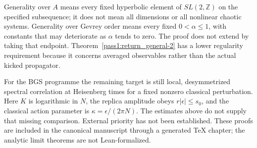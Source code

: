 Generality over \(A\) means every fixed hyperbolic element of
\(SL(2,\mathbb Z)\) on the specified subsequence; it does not mean
all dimensions or all nonlinear chaotic systems.
Generality over Gevrey order means every fixed \(0<\alpha\le1\),
with constants that may deteriorate as \(\alpha\) tends to zero.
The proof does not extend by taking that endpoint.
Theorem~\ref{pass1:return_general-2} has a lower regularity requirement because it concerns
averaged observables rather than the actual kicked propagator.

For the BGS programme the remaining target is still local,
desymmetrized spectral correlation at Heisenberg times for a fixed
nonzero classical perturbation. Here \(K\) is logarithmic in \(N\),
the replica amplitude obeys \(r|\epsilon|\le s_0\), and the classical
action parameter is \(\kappa=\epsilon/(2\pi N)\). The estimates above do not
supply that missing comparison. External priority has not been established.
These proofs are included in the canonical manuscript through a generated
TeX chapter; the analytic limit theorems are not Lean-formalized.
